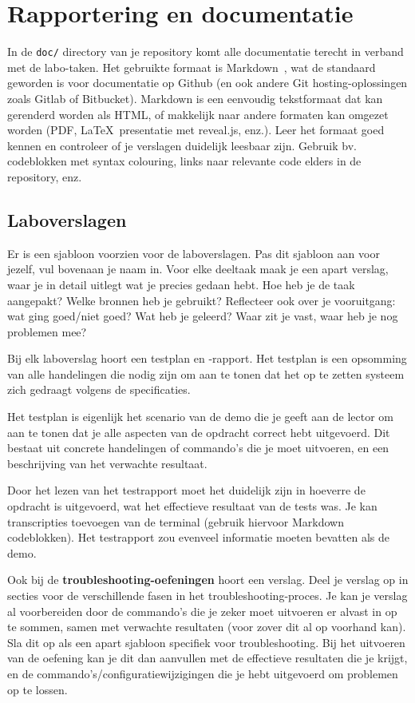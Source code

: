 \section{Rapportering en documentatie}
\label{sec:rapportering-en-documentatie}

In de \texttt{doc/} directory van je repository komt alle documentatie terecht in verband met de labo-taken. Het gebruikte formaat is Markdown~\autocite{Gruber2004,Github2016}, wat de standaard geworden is voor documentatie op Github (en ook andere Git hosting-oplossingen zoals Gitlab of Bitbucket). Markdown is een eenvoudig tekstformaat dat kan gerenderd worden als HTML, of makkelijk naar andere formaten kan omgezet worden (PDF, \LaTeX\, presentatie met reveal.js, enz.). Leer het formaat goed kennen en controleer of je verslagen duidelijk leesbaar zijn. Gebruik bv. codeblokken met syntax colouring, links naar relevante code elders in de repository, enz.

\subsection{Laboverslagen}
\label{subs:laboverslagen}

Er is een sjabloon voorzien voor de laboverslagen. Pas dit sjabloon aan voor jezelf, vul bovenaan je naam in. Voor elke deeltaak maak je een apart verslag, waar je in detail uitlegt wat je precies gedaan hebt. Hoe heb je de taak aangepakt? Welke bronnen heb je gebruikt? Reflecteer ook over je vooruitgang: wat ging goed/niet goed? Wat heb je geleerd? Waar zit je vast, waar heb je nog problemen mee?

Bij elk laboverslag hoort een testplan en -rapport. Het testplan is een opsomming van alle handelingen die nodig zijn om aan te tonen dat het op te zetten systeem zich gedraagt volgens de specificaties.

Het testplan is eigenlijk het scenario van de demo die je geeft aan de lector om aan te tonen dat je alle aspecten van de opdracht correct hebt uitgevoerd. Dit bestaat uit concrete handelingen of commando's die je moet uitvoeren, en een beschrijving van het verwachte resultaat.

Door het lezen van het testrapport moet het duidelijk zijn in hoeverre de opdracht is uitgevoerd, wat het effectieve resultaat van de tests was. Je kan transcripties toevoegen van de terminal (gebruik hiervoor Markdown codeblokken).  Het testrapport zou evenveel informatie moeten bevatten als de demo.

Ook bij de \textbf{troubleshooting-oefeningen} hoort een verslag. Deel je verslag op in secties voor de verschillende fasen in het troubleshooting-proces. Je kan je verslag al voorbereiden door de commando's die je zeker moet uitvoeren er alvast in op te sommen, samen met verwachte resultaten (voor zover dit al op voorhand kan). Sla dit op als een apart sjabloon specifiek voor troubleshooting. Bij het uitvoeren van de oefening kan je dit dan aanvullen met de effectieve resultaten die je krijgt, en de commando's/configuratiewijzigingen die je hebt uitgevoerd om problemen op te lossen.

